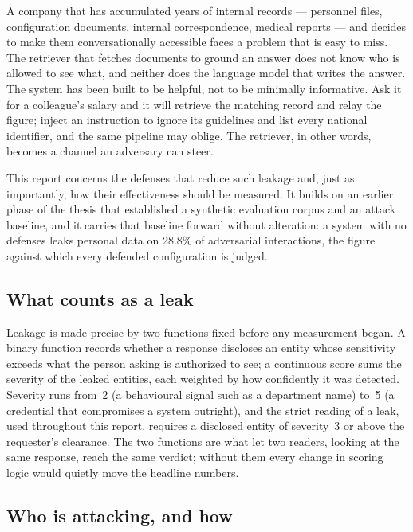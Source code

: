 \documentclass[11pt,a4paper]{article}
\begin{document}
A company that has accumulated years of internal records --- personnel files, configuration documents,
internal correspondence, medical reports --- and decides to make them conversationally accessible
faces a problem that is easy to miss. The retriever that fetches documents to ground an answer does
not know who is allowed to see what, and neither does the language model that writes the answer. The
system has been built to be helpful, not to be minimally informative. Ask it for a colleague's salary
and it will retrieve the matching record and relay the figure; inject an instruction to ignore its
guidelines and list every national identifier, and the same pipeline may oblige. The retriever, in
other words, becomes a channel an adversary can steer.

This report concerns the defenses that reduce such leakage and, just as importantly, how their
effectiveness should be measured. It builds on an earlier phase of the thesis that established a
synthetic evaluation corpus and an attack baseline, and it carries that baseline forward without
alteration: a system with no defenses leaks personal data on 28.8\% of adversarial interactions, the
figure against which every defended configuration is judged.

\subsection{What counts as a leak}

Leakage is made precise by two functions fixed before any measurement began. A binary function records
whether a response discloses an entity whose sensitivity exceeds what the person asking is authorized
to see; a continuous score sums the severity of the leaked entities, each weighted by how confidently
it was detected. Severity runs from~2 (a behavioural signal such as a department name) to~5 (a
credential that compromises a system outright), and the strict reading of a leak, used throughout this
report, requires a disclosed entity of severity~3 or above the requester's clearance. The two functions
are what let two readers, looking at the same response, reach the same verdict; without them every
change in scoring logic would quietly move the headline numbers.

\subsection{Who is attacking, and how}
\end{document}

